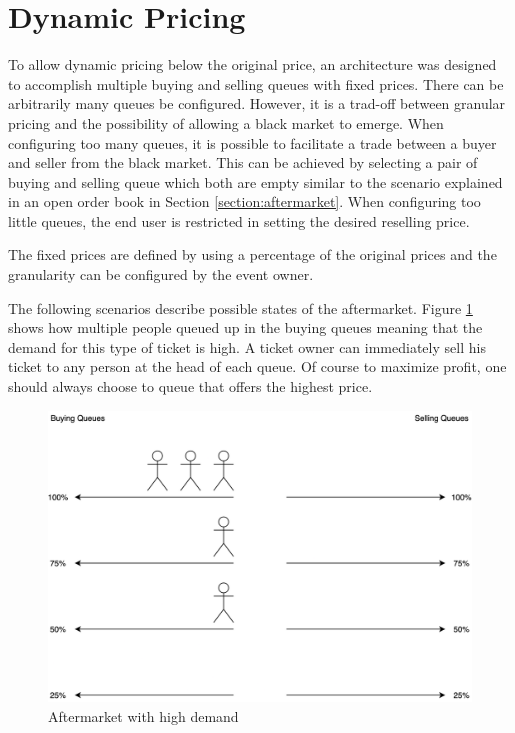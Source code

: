 \section{Dynamic Pricing}
To allow dynamic pricing below the original price, an architecture was designed to accomplish multiple buying and selling queues with fixed prices. There can be arbitrarily many queues be configured. However, it is a trad-off between granular pricing and the possibility of allowing a black market to emerge. When configuring too many queues, it is possible to facilitate a trade between a buyer and seller from the black market. This can be achieved by selecting a pair of buying and selling queue which both are empty similar to the scenario explained in an open order book in Section \ref{section:aftermarket}. When configuring too little queues, the end user is restricted in setting the desired reselling price. 

The fixed prices are defined by using a percentage of the original prices and the granularity can be configured by the event owner. 

The following scenarios describe possible states of the aftermarket. Figure \ref{fig:aftermarket-high-demand} shows how multiple people queued up in the buying queues meaning that the demand for this type of ticket is high. A ticket owner can immediately sell his ticket to any person at the head of each queue. Of course to maximize profit, one should always choose to queue that offers the highest price.

\begin{figure}[H]
    \centering
    \includegraphics[width=16cm]{figures/aftermarket-high-demand.png}
    \caption{Aftermarket with high demand}
    \label{fig:aftermarket-high-demand}
\end{figure}

